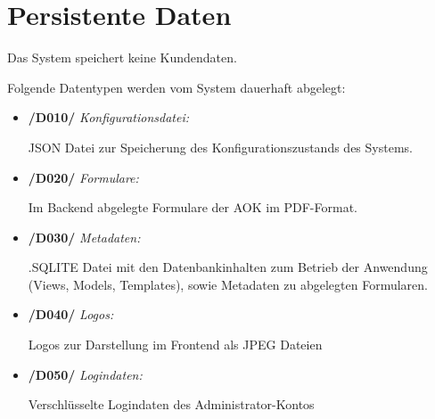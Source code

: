\section{Persistente Daten}
Das System speichert keine Kundendaten.\par
\vspace{0.5cm}
Folgende Datentypen werden vom System dauerhaft abgelegt:

\begin{itemize}
    \item \textbf{/D010/} \textit{Konfigurationsdatei:} \par
    JSON Datei zur Speicherung des Konfigurationszustands des Systems.
    
    \item \textbf{/D020/} \textit{Formulare:} \par
    Im Backend abgelegte Formulare der AOK im PDF-Format.
    
    \item \textbf{/D030/} \textit{Metadaten:} \par
    .SQLITE Datei mit den Datenbankinhalten zum Betrieb der Anwendung (Views, Models, Templates), sowie Metadaten zu abgelegten Formularen.
    
    \item \textbf{/D040/} \textit{Logos:} \par
    Logos zur Darstellung im Frontend als JPEG Dateien
    
    \item \textbf{/D050/} \textit{Logindaten:} \par
    Verschlüsselte Logindaten des Administrator-Kontos
\end{itemize}